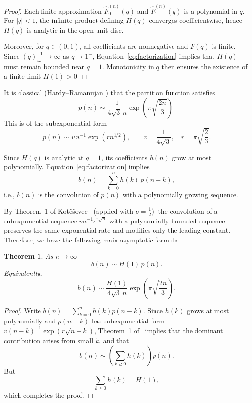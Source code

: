 \documentclass[letterpaper,12pt]{article}
\newtheorem{theorem}{Theorem}
\begin{document}
\begin{proof}
Each finite approximation $\widehat F^{(n)}_0(q)$ and
$\widehat F^{(n)}_1(q)$ is a polynomial in $q$.
For $|q|<1$, the infinite product defining $H(q)$ converges coefficientwise,
hence $H(q)$ is analytic in the open unit disc.

Moreover, for $q\in(0,1)$, all coefficients are nonnegative and
$F(q)$ is finite.
Since $(q)_\infty^{-1}\to\infty$ as $q\to1^-$,
Equation~\eqref{eq:factorization} implies that $H(q)$
must remain bounded near $q=1$.
Monotonicity in $q$ then ensures the existence of a finite limit $H(1)>0$.
\end{proof}

 

It is classical (Hardy--Ramanujan \cite{Andrews_1984}) that the partition function satisfies
\begin{equation}
    p(n)\sim
\frac{1}{4\sqrt3\,n}
\exp\!\left(\pi\sqrt{\frac{2n}{3}}\right).
\end{equation}
This is of the subexponential form
\[
p(n)\sim
v\, n^{-1}\exp\!\left(r n^{1/2}\right),
\qquad
v=\frac{1}{4\sqrt3},
\quad
r=\pi\sqrt{\frac{2}{3}}.
\]

Since $H(q)$ is analytic at $q=1$,
its coefficients $h(n)$ grow at most polynomially.
Equation~\eqref{eq:factorization} implies
\[
b(n)=\sum_{k=0}^n h(k)\,p(n-k),
\]
i.e., $b(n)$ is the convolution of $p(n)$ with a polynomially growing sequence.

By Theorem~1 of Kotěšovec~\cite{kotesovec2015method}
(applied with $p=\tfrac12$),
the convolution of a subexponential sequence
$v n^{-1} e^{r\sqrt n}$ with a polynomially bounded sequence
preserves the same exponential rate and modifies only the leading constant.
Therefore, we have the following main asymptotic formula.

\begin{theorem}
As $n\to\infty$,
\[
b(n)\sim H(1)\,p(n).
\]
Equivalently,
\[
b(n)\sim
\frac{H(1)}{4\sqrt3\,n}
\exp\!\left(\pi\sqrt{\frac{2n}{3}}\right).
\]
\end{theorem}

\begin{proof}
Write $b(n)=\sum_{k=0}^n h(k)p(n-k)$.
Since $h(k)$ grows at most polynomially and
$p(n-k)$ has subexponential form
$v(n-k)^{-1}\exp(r\sqrt{n-k})$,
Theorem~1 of~\cite{kotesovec2015method}
implies that the dominant contribution arises from small $k$,
and that
\[
b(n)\sim
\left(\sum_{k\ge0}h(k)\right)p(n).
\]
But
\[
\sum_{k\ge0}h(k)=H(1),
\]
which completes the proof.
\end{proof}
\end{document}
